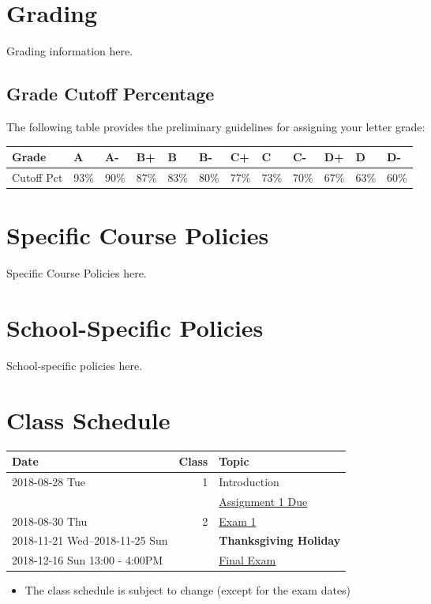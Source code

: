 \documentclass[article,letterpaper,times,10pt,listings-bw,microtype]{scrartcl}
\begin{document}
\section*{Grading}
\label{sec:org004e9ec}
Grading information here.
\subsection*{Grade Cutoff Percentage}
\label{sec:orgbd90883}
The following table provides the preliminary guidelines for assigning your
letter grade:

\begin{center}
\begin{tabular}{llllllllllll}
\hline
Grade & A & A- & B+ & B & B- & C+ & C & C- & D+ & D & D-\\
\hline
Cutoff Pct & 93\% & 90\% & 87\% & 83\% & 80\% & 77\% & 73\% & 70\% & 67\% & 63\% & 60\%\\
\hline
\end{tabular}
\end{center}
\section*{Specific Course Policies}
\label{sec:org92919a0}
Specific Course Policies here.
\section*{School-Specific Policies}
\label{sec:org792950d}
School-specific policies here.
\clearpage
\section*{Class Schedule}
\label{sec:org157d60a}
\begin{center}
\begin{tabular}{lrl}
Date & Class & Topic\\
\hline
2018-08-28 Tue & 1 & Introduction\\
 &  & \uline{Assignment 1 Due}\\
2018-08-30 Thu & 2 & \uline{Exam 1}\\
2018-11-21 Wed--2018-11-25 Sun &  & \textbf{Thanksgiving Holiday}\\
2018-12-16 Sun 13:00  - 4:00PM &  & \uline{Final Exam}\\
\end{tabular}
\end{center}

\begin{mdframed}[style=exampledefault, frametitle={Disclaimer}]
\begin{itemize}
\item The class schedule is subject to change (except for the exam dates)
\end{itemize}
\end{mdframed}
\end{document}
